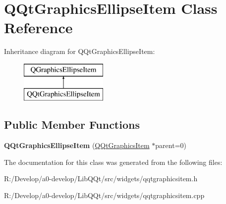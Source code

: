 \hypertarget{class_q_qt_graphics_ellipse_item}{}\section{Q\+Qt\+Graphics\+Ellipse\+Item Class Reference}
\label{class_q_qt_graphics_ellipse_item}
Inheritance diagram for Q\+Qt\+Graphics\+Ellipse\+Item\+:\begin{figure}[H]
\begin{center}
\leavevmode
\includegraphics[height=2.000000cm]{class_q_qt_graphics_ellipse_item}
\end{center}
\end{figure}
\subsection*{Public Member Functions}
\begin{DoxyCompactItemize}
\item 
\mbox{\label{class_q_qt_graphics_ellipse_item_a340a93bd32a8c3c95c2baf8331ef074d}} 
{\bfseries Q\+Qt\+Graphics\+Ellipse\+Item} (\mbox{\hyperlink{class_q_qt_graphics_item}{Q\+Qt\+Graphics\+Item}} $\ast$parent=0)
\end{DoxyCompactItemize}


The documentation for this class was generated from the following files\+:\begin{DoxyCompactItemize}
\item 
R\+:/\+Develop/a0-\/develop/\+Lib\+Q\+Qt/src/widgets/qqtgraphicsitem.\+h\item 
R\+:/\+Develop/a0-\/develop/\+Lib\+Q\+Qt/src/widgets/qqtgraphicsitem.\+cpp\end{DoxyCompactItemize}
